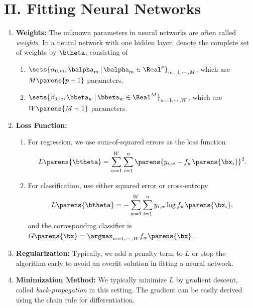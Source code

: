 \documentclass[12pt]{article}
\begin{document}
\section*{II. Fitting Neural Networks}

\begin{enumerate}[label=\textbf{\arabic*.}]

	\item \textbf{Weights:} The unknown parameters in neural networks are often called \textit{weights}. In a neural network with one hidden layer, denote the complete set of weights by $\btheta$, consisting of 
	\begin{enumerate}
		\item $\sets{\alpha_{0,m}, \balpha_m \,\vert\, \balpha_m \in \Real^p}_{m = 1, \cdots, M}$, which are $M \parens{p+1}$ parameters, 
		\item $\sets{\beta_{0,w}, \bbeta_w \,\vert\, \bbeta_w \in \Real^M}_{w = 1, \cdots, W}$, which are $W \parens{M+1}$ parameters. 
	\end{enumerate}
	
	\item \textbf{Loss Function:} 
	\begin{enumerate}
		\item For regression, we use sum-of-squared errors as the loss function 
		\begin{align}
			L \parens{\btheta} = \sum_{w=1}^W \sum_{i=1}^n \parens{y_{i,w} - f_w \parens{\bx_i}}^2. 
		\end{align}
		\item For classification, use either squared error or cross-entropy  
		\begin{align}
			L \parens{\btheta} = - \sum_{w=1}^W \sum_{i=1}^n y_{i,w} \log f_w \parens{\bx_i}, 
		\end{align}
		and the corresponding classifier is $G \parens{\bx} = \argmax_{w=1,\cdots,W} f_w \parens{\bx}$. 
	\end{enumerate}
	
	\item \textbf{Regularization:} Typically, we add a penalty term to $L$ or stop the algorithm early to avoid an overfit solution in fitting a neural network. 
	
	\item \textbf{Minimization Method:} We typically minimize $L$ by gradient descent, called \textit{back-propagation} in this setting. The gradient can be easily derived using the chain rule for differentiation. 
	

\end{enumerate}
\end{document}

